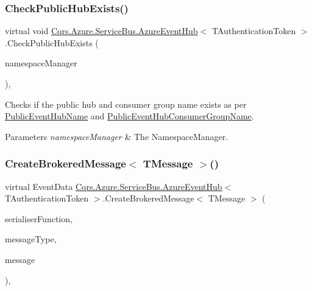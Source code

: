 \subsubsection{\texorpdfstring{Check\+Public\+Hub\+Exists()}{CheckPublicHubExists()}}
{\footnotesize\ttfamily virtual void \hyperlink{classCqrs_1_1Azure_1_1ServiceBus_1_1AzureEventHub}{Cqrs.\+Azure.\+Service\+Bus.\+Azure\+Event\+Hub}$<$ T\+Authentication\+Token $>$.Check\+Public\+Hub\+Exists (\begin{DoxyParamCaption}\item[{Namespace\+Manager}]{namespace\+Manager }\end{DoxyParamCaption})\hspace{0.3cm}{\ttfamily [protected]}, {\ttfamily [virtual]}}



Checks if the public hub and consumer group name exists as per \hyperlink{classCqrs_1_1Azure_1_1ServiceBus_1_1AzureEventHub_a6012f2290f9397929e9d6d5419963482_a6012f2290f9397929e9d6d5419963482}{Public\+Event\+Hub\+Name} and \hyperlink{classCqrs_1_1Azure_1_1ServiceBus_1_1AzureEventHub_a505c495eb73e4f888431d408e0b0d8ab_a505c495eb73e4f888431d408e0b0d8ab}{Public\+Event\+Hub\+Consumer\+Group\+Name}. 


\begin{DoxyParams}{Parameters}
{\em namespace\+Manager} & The Namespace\+Manager.\\
\hline
\end{DoxyParams}
\mbox{\label{classCqrs_1_1Azure_1_1ServiceBus_1_1AzureEventHub_a8302c7e2f88a666862b3d9fd4531b1f2_a8302c7e2f88a666862b3d9fd4531b1f2}} 
\subsubsection{\texorpdfstring{Create\+Brokered\+Message$<$ T\+Message $>$()}{CreateBrokeredMessage< TMessage >()}}
{\footnotesize\ttfamily virtual Event\+Data \hyperlink{classCqrs_1_1Azure_1_1ServiceBus_1_1AzureEventHub}{Cqrs.\+Azure.\+Service\+Bus.\+Azure\+Event\+Hub}$<$ T\+Authentication\+Token $>$.Create\+Brokered\+Message$<$ T\+Message $>$ (\begin{DoxyParamCaption}\item[{Func$<$ T\+Message, string $>$}]{serialiser\+Function,  }\item[{Type}]{message\+Type,  }\item[{T\+Message}]{message }\end{DoxyParamCaption})\hspace{0.3cm}{\ttfamily [protected]}, {\ttfamily [virtual]}}



